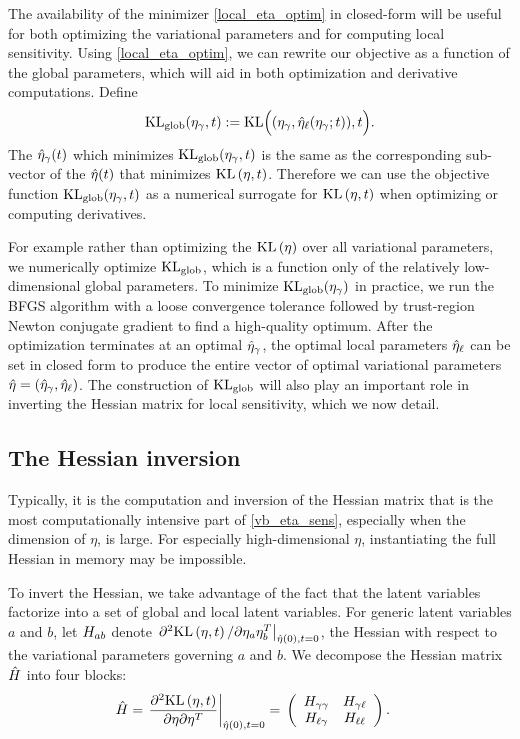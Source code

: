 The availability of the minimizer \eqref{local_eta_optim} in closed-form will be
useful for both optimizing the variational parameters and for computing local
sensitivity.  Using \eqref{local_eta_optim}, we can rewrite our objective as a
function of the global parameters, which will aid in both optimization and
derivative computations.  Define
%
\begin{align*}
\mathrm{KL}_{\mathrm{glob}}(\eta_{\gamma}, t) :=
    \mathrm{KL}\Big((\eta_{\gamma}, \hat\eta_{\ell}(\eta_{\gamma}; t)), t\Big).
\end{align*}
%
The $\hat\eta_{\gamma}(t)$ which minimizes $\mathrm{KL}_{\mathrm{glob}}(\eta_{\gamma}, t)$ is the same as
the corresponding sub-vector of the $\hat\eta(t)$ that minimizes $\mathrm{KL}\left(\eta,
t\right)$.  Therefore we can use the objective function $\mathrm{KL}_{\mathrm{glob}}(\eta_{\gamma}, t)$ as
a numerical surrogate for $\mathrm{KL}\left(\eta, t\right)$ when optimizing or computing
derivatives.

For example rather than optimizing the $\mathrm{KL}\left(\eta\right)$ over all variational
parameters, we numerically optimize $\mathrm{KL}_{\mathrm{glob}}$, which is a function only of the
relatively low-dimensional global parameters.  To minimize $\mathrm{KL}_{\mathrm{glob}}(\eta_{\gamma})$
in practice, we run the BFGS algorithm with a loose convergence tolerance
followed by trust-region Newton conjugate gradient
\citep[Chapter~7]{nocedal:2006:numerical} to find a high-quality optimum. After
the optimization terminates at an optimal $\hat\eta_{\gamma}$, the optimal local
parameters $\hat\eta_{\ell}$ can be set in closed form to produce the entire vector
of optimal variational parameters $\hat\eta = (\hat\eta_{\gamma}, \hat\eta_{\ell})$.
%
The construction of $\mathrm{KL}_{\mathrm{glob}}$ will also play an important role in inverting
the Hessian matrix for local sensitivity, which we now detail.


\subsection{The Hessian inversion}

Typically, it is the computation and inversion of the Hessian matrix that is
the most computationally intensive part of \eqref{vb_eta_sens}, especially when
the dimension of $\eta$, is large.
For especially high-dimensional $\eta$,
instantiating the full Hessian in memory
may be impossible.

To invert the Hessian, we take advantage of the fact that the latent variables
factorize into a set of global and local latent variables.
For generic latent variables $a$ and $b$,
let $H_{ab}$ denote $\left.\partial^2 \mathrm{KL}\left(\eta, t\right) / \partial \eta_a
\eta_b^T\right|_{\hat\eta(0), t=0}$, the Hessian with respect to the variational
parameters governing $a$ and $b$.
We decompose the Hessian matrix $\hat{H}$ into four blocks:
%
\begin{align*}
%
\hessopt =
\fracat{\partial^2 \KL{\eta, \t}}
       {\partial \eta \partial \eta^T}
       {\etaopt(0), t= 0} ={}&
\left(
\begin{array}{cc}
   \hess{\gamma\gamma} & \hess{\gamma\ell} \\
   \hess{\ell\gamma}     & \hess{\ell\ell} \\
\end{array}
\right).
%
\end{align*}

